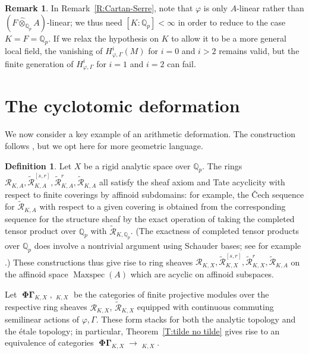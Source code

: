 \documentclass[12pt]{amsart}
\theoremstyle{definition}
\newtheorem{defn}[theorem]{Definition}
\newtheorem{remark}[theorem]{Remark}
\numberwithin{equation}{theorem}
\newcommand{\QQ}{\mathbb{Q}}
\newcommand{\calR}{\mathcal{R}}
\DeclareMathOperator{\Maxspec}{Maxspec}
\DeclareMathOperator{\PhiGamma}{\mathbf{\Phi \Gamma}}
\DeclareMathOperator{\PhiGammatilde}{\widetilde{\mathbf{\Phi \Gamma}}}
\begin{document}
\begin{remark}
In Remark~\ref{R:Cartan-Serre}, 
note that $\varphi$ is only $A$-linear rather than $(F \widehat{\otimes}_{\QQ_p} A)$-linear; we thus need $[K:\QQ_p] < \infty$ in order to reduce to the case $K = F = \QQ_p$.
If we relax the hypothesis on $K$ to allow it to be a more general local field, the vanishing of $H^i_{\varphi, \Gamma}(M)$ for $i=0$ and $i>2$ remains valid, but the finite generation of $H^i_{\varphi,\Gamma}$ for $i=1$ and $i=2$ can fail.
\end{remark}

\section{The cyclotomic deformation}

We now consider a key example of an arithmetic deformation. The construction follows
\cite[Definition~4.4.7]{kpx}, but we opt here for  more geometric language.

\begin{defn}
Let $X$ be a rigid analytic space over $\QQ_p$. 
The rings $\calR_{K,A}, \tilde{\calR}^{[s,r]}_{K,A}, \tilde{\calR}^{r}_{K,A}, \tilde{\calR}_{K,A}$ all satisfy the sheaf axiom and Tate acyclicity with respect to finite coverings by affinoid subdomains: for example, the \v{C}ech sequence for $\tilde{\calR}_{K,A}$
with respect to a given covering is obtained from the corresponding sequence for the structure sheaf by the exact operation of 
taking the completed tensor product over $\QQ_p$ with $\tilde{\calR}_{K,\QQ_p}$.
(The exactness of completed tensor products over $\QQ_p$ does involve a nontrivial argument using Schauder bases; see for example \cite[Lemma~2.2.9]{kedlaya-liu1}.)
These constructions thus give rise to ring sheaves $\calR_{K,X}, \tilde{\calR}^{[s,r]}_{K,X}, \tilde{\calR}^{r}_{K,X}, \tilde{\calR}_{K,A}$ on the affinoid space $\Maxspec(A)$ which are acyclic on affinoid subspaces.

Let $\PhiGamma_{K,X}, \PhiGammatilde_{K,X}$ be the categories of finite projective
modules over the respective ring sheaves $\calR_{K,X}$, $\tilde{\calR}_{K,X}$ equipped with continuous commuting semilinear actions of $\varphi, \Gamma$. 
These form stacks for both the analytic topology and the \'etale topology; in particular, Theorem~\ref{T:tilde no tilde} gives rise to an equivalence of categories $\PhiGamma_{K,X} \to \PhiGammatilde_{K,X}$.
\end{defn}
\end{document}
